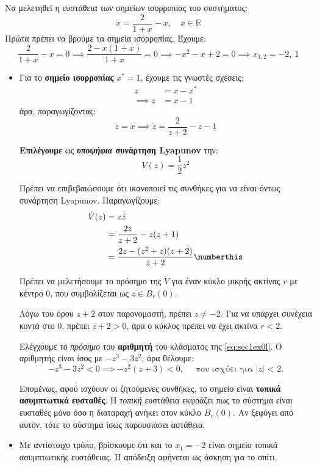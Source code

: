\documentclass[11pt,a4paper,notitlepage,fleqn]{article}
\begin{document}
\begin{exercise}
	Να μελετηθεί η ευστάθεια των σημείων ισορροπίας του συστήματος:
	\[
	\dot x = \frac{2}{1+x}-x,\quad x\in\mathbb R
	\]
	\tcblower
	Πρώτα πρέπει να βρούμε τα σημεία ισορροπίας. Έχουμε:
	\[
	\frac{2}{1+x} - x = 0 \implies \frac{2-x(1+x)}{1+x} = 0
	\implies -x^2 -x +2 = 0 \implies x_{1,2} = -2,\ 1
	\]

	\begin{itemize}
		\item Για το \textbf{σημείο ισορροπίας} \( x^* = 1 \), έχουμε τις γνωστές
		σχέσεις:
		\begin{align*}
			z &= x-x^* \\ \implies
			z &= x-1
		\end{align*}
		άρα, παραγωγίζοντας:
		\[
		\dot z = \dot x \implies \dot z = \frac{2}{z+2} -z -1
		\]

		\textbf{Επιλέγουμε} ως \textbf{\textit{υποψήφια} συνάρτηση Lyapunov} την:
		\[
		V(z) = \frac{1}{2} z^2
		\]

		Πρέπει να επιβεβαιώσουμε ότι ικανοποιεί τις συνθήκες για να είναι όντως
		συνάρτηση Lyapunov. Παραγωγίζουμε:
		\begin{align*}
			\dot V(z) &= z\dot z \\
			 &= \frac{2z}{z+2} - z(z+1) \\
			&= \frac{2z-(z^2+z)(z+2)}{z+2} \numberthis \label{eq:sec1ex0l}
		\end{align*}

		Πρέπει να μελετήσουμε το πρόσημο της \( \dot V \) για έναν κύκλο
		μικρής ακτίνας \( r \) με κέντρο 0, που συμβολίζεται ως \( z \in B_r(0) \).

		Λόγω του όρου \( z+2 \) στον παρονομαστή, πρέπει \( z\neq -2 \). Για να υπάρχει
		συνέχεια κοντά στο 0, πρέπει \( z+2 > 0 \), άρα ο κύκλος πρέπει να έχει ακτίνα
		\( r < 2 \).

		Ελέγχουμε το \textit{πρόσημο} του \textbf{αριθμητή} του κλάσματος της \eqref{eq:sec1ex0l}. Ο αριθμητής είναι ίσος με \( -z^3-3z^2 \), άρα θέλουμε:
		\[
		-z^3 - 3z^2 < 0 \implies -z^2(z+3) < 0, \quad \text{ που ισχύει για $|z|$ < 2}. 
		\]

		Επομένως, αφού ισχύουν οι ζητούμενες συνθήκες, το σημείο είναι
		\textbf{τοπικά ασυμπτωτικά ευσταθές}. Η \textit{τοπική} ευστάθεια εκφράζει πως το
		σύστημα είναι ευσταθές μόνο όσο η διαταραχή ανήκει στον κύκλο \( B_r(0) \). Αν
		ξεφύγει από αυτόν, τότε το σύστημα ίσως παρουσιάσει αστάθεια.

		\item Με αντίστοιχο τρόπο, βρίσκουμε ότι και το \( x_1 = -2 \) είναι σημείο
		τοπικά ασυμπτωτικής ευστάθειας. Η απόδειξη αφήνεται ως άσκηση για το σπίτι.
	\end{itemize}
\end{exercise}
\end{document}
